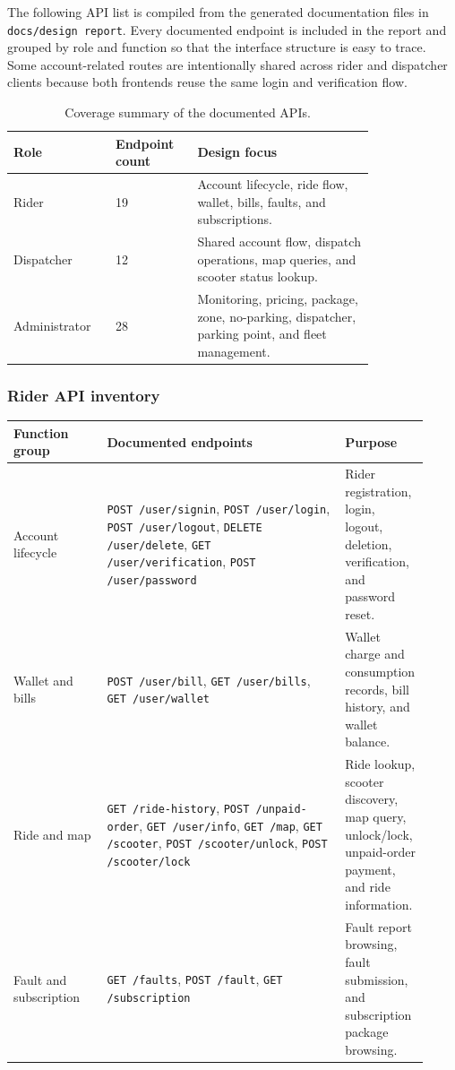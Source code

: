 \documentclass[12pt,a4paper]{article}
\begin{document}
The following API list is compiled from the generated documentation files in \texttt{docs/design report}. Every documented endpoint is included in the report and grouped by role and function so that the interface structure is easy to trace. Some account-related routes are intentionally shared across rider and dispatcher clients because both frontends reuse the same login and verification flow.

\begin{table}[H]
\centering
\begin{tabular}{p{0.20\linewidth} p{0.18\linewidth} p{0.42\linewidth}}
\toprule
\textbf{Role} & \textbf{Endpoint count} & \textbf{Design focus} \\
\midrule
Rider & 19 & Account lifecycle, ride flow, wallet, bills, faults, and subscriptions. \\
Dispatcher & 12 & Shared account flow, dispatch operations, map queries, and scooter status lookup. \\
Administrator & 28 & Monitoring, pricing, package, zone, no-parking, dispatcher, parking point, and fleet management. \\
\bottomrule
\end{tabular}
\caption{Coverage summary of the documented APIs.}
\end{table}

\subsubsection{Rider API inventory}

\begin{longtable}{p{0.22\linewidth} p{0.56\linewidth} p{0.14\linewidth}}
\toprule
\textbf{Function group} & \textbf{Documented endpoints} & \textbf{Purpose} \\
\midrule
\endhead
Account lifecycle & \texttt{POST /user/signin}, \texttt{POST /user/login}, \texttt{POST /user/logout}, \texttt{DELETE /user/delete}, \texttt{GET /user/verification}, \texttt{POST /user/password} & Rider registration, login, logout, deletion, verification, and password reset. \\
Wallet and bills & \texttt{POST /user/bill}, \texttt{GET /user/bills}, \texttt{GET /user/wallet} & Wallet charge and consumption records, bill history, and wallet balance. \\
Ride and map & \texttt{GET /ride-history}, \texttt{POST /unpaid-order}, \texttt{GET /user/info}, \texttt{GET /map}, \texttt{GET /scooter}, \texttt{POST /scooter/unlock}, \texttt{POST /scooter/lock} & Ride lookup, scooter discovery, map query, unlock/lock, unpaid-order payment, and ride information. \\
Fault and subscription & \texttt{GET /faults}, \texttt{POST /fault}, \texttt{GET /subscription} & Fault report browsing, fault submission, and subscription package browsing. \\
\bottomrule
\end{longtable}
\end{document}
